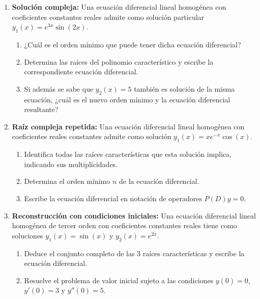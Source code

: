\documentclass[a4paper,11pt]{article}
\begin{document}
\begin{enumerate}[itemsep=0.25cm]
    \item \textbf{Solución compleja:} Una ecuación diferencial lineal homogénea con coeficientes constantes reales admite como solución particular $y_1(x) = e^{3x} \sin(2x)$.
    \begin{enumerate}[label=(\alph*), itemsep=0.08cm]
        \item ¿Cuál es el orden mínimo que puede tener dicha ecuación diferencial?
        \item Determina las raíces del polinomio característico y escribe la correspondiente ecuación diferencial.
        \item Si además se sabe que $y_2(x) = 5$ también es solución de la misma ecuación, ¿cuál es el nuevo orden mínimo y la ecuación diferencial resultante?
    \end{enumerate}

    \item \textbf{Raíz compleja repetida:} Una ecuación diferencial lineal homogénea con coeficientes reales constantes admite como solución $y_1(x) = x e^{-x} \cos(x)$.
    \begin{enumerate}[label=(\alph*), itemsep=0.08cm]
        \item Identifica todas las raíces características que esta solución implica, indicando sus multiplicidades.
        \item Determina el orden mínimo $n$ de la ecuación diferencial.
        \item Escribe la ecuación diferencial en notación de operadores $P(D)y = 0$.
    \end{enumerate}

    \item \textbf{Reconstrucción con condiciones iniciales:} Una ecuación diferencial lineal homogénea de tercer orden con coeficientes constantes reales tiene como soluciones $y_1(x) = \sin(x)$ y $y_2(x) = e^{2x}$.
    \begin{enumerate}[label=(\alph*), itemsep=0.08cm]
        \item Deduce el conjunto completo de las 3 raíces características y escribe la ecuación diferencial.
        \item Resuelve el problema de valor inicial sujeto a las condiciones $y(0) = 0$, $y'(0) = 3$ y $y''(0) = 5$.
    \end{enumerate}
\end{enumerate}
\end{document}
